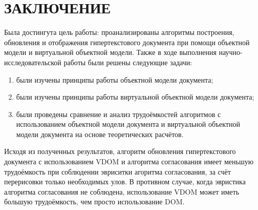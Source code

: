 \section*{ЗАКЛЮЧЕНИЕ}

Была достингута цель работы: проанализированы алгоритмы построения, обновления и отображения гипертекстового документа при помощи объектной модели и виртуальной объектной модели.
Также в ходе выполнения научно-исследовательской работы были решены следующие задачи: 
\begin{enumerate}[label=\arabic*)]
	\item были изучены принципы работы объектной модели документа;
	\item были изучены принципы работы виртуальной объектной модели документа;
	\item были проведены сравнение и анализ трудоёмкостей алгоритмов с использованием объектной модели документа и виртуальной объектной модели документа на основе теоретических расчётов.
\end{enumerate}

Исходя из полученных результатов, алгоритм обновления гипертекстового документа с использованием VDOM и алгоритма согласования имеет меньшую трудоёмкость при соблюдении эвриситки агоритма согласования, за счёт перерисовки только необходимых улов.
В противном случае, когда эвристика алгоритма согласования не соблюдена, использование VDOM может иметь большую трудоёмкость, чем просто использование DOM.

\pagebreak